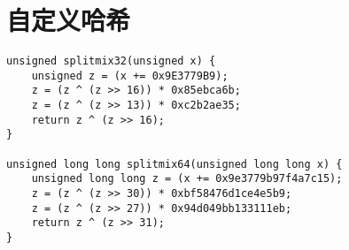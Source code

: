 \section{自定义哈希}

\begin{verbatim}
unsigned splitmix32(unsigned x) {
    unsigned z = (x += 0x9E3779B9);
    z = (z ^ (z >> 16)) * 0x85ebca6b;
    z = (z ^ (z >> 13)) * 0xc2b2ae35;
    return z ^ (z >> 16);
}

unsigned long long splitmix64(unsigned long long x) {
    unsigned long long z = (x += 0x9e3779b97f4a7c15);
    z = (z ^ (z >> 30)) * 0xbf58476d1ce4e5b9;
    z = (z ^ (z >> 27)) * 0x94d049bb133111eb;
    return z ^ (z >> 31);
}
\end{verbatim}